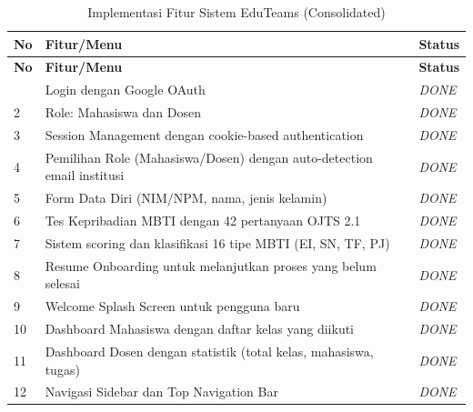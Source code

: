 \begin{longtable}{|p{}|p{}|p{}|}
	\caption{Implementasi Fitur Sistem EduTeams (Consolidated)}
	\label{tab:implementasi-fitur}                                                                                    \\
	\hline
	\textbf{No} & \textbf{Fitur/Menu}                                                          & \textbf{Status}      \\
	\hline
	\endfirsthead
	\hline
	\textbf{No} & \textbf{Fitur/Menu}                                                          & \textbf{Status}      \\
	\hline
	\endhead
	\hline
	\endfoot
	\hline
	\endlastfoot
	1           & Login dengan Google OAuth                                                    & \textit{DONE}        \\
	\hline
	2           & Role: Mahasiswa dan Dosen                                                    & \textit{DONE}        \\
	\hline
	3           & Session Management dengan cookie-based authentication                        & \textit{DONE}        \\
	\hline
	4           & Pemilihan Role (Mahasiswa/Dosen) dengan auto-detection email institusi       & \textit{DONE}        \\
	\hline
	5           & Form Data Diri (NIM/NPM, nama, jenis kelamin)                                & \textit{DONE}        \\
	\hline
	6           & Tes Kepribadian MBTI dengan 42 pertanyaan OJTS 2.1                           & \textit{DONE}        \\
	\hline
	7           & Sistem scoring dan klasifikasi 16 tipe MBTI (EI, SN, TF, PJ)                 & \textit{DONE}        \\
	\hline
	8           & Resume Onboarding untuk melanjutkan proses yang belum selesai                & \textit{DONE}        \\
	\hline
	9           & Welcome Splash Screen untuk pengguna baru                                    & \textit{DONE}        \\
	\hline
	10          & Dashboard Mahasiswa dengan daftar kelas yang diikuti                         & \textit{DONE}        \\
	\hline
	11          & Dashboard Dosen dengan statistik (total kelas, mahasiswa, tugas)             & \textit{DONE}        \\
	\hline
	12          & Navigasi Sidebar dan Top Navigation Bar                                      & \textit{DONE}        \\

\end{longtable}
